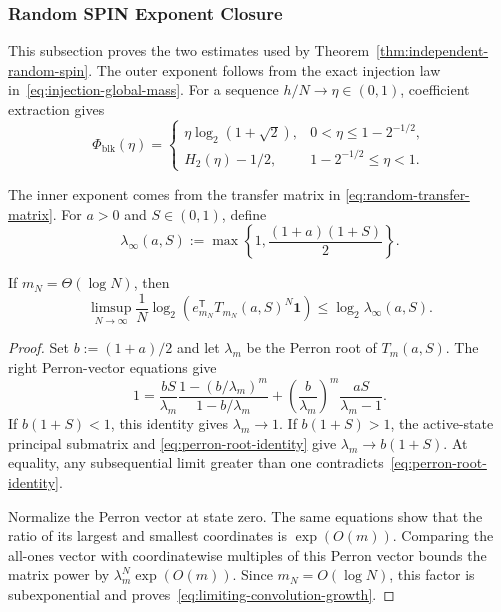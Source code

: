 \subsubsection{Random SPIN Exponent Closure}
\label{app:random-spin-exponents}

This subsection proves the two estimates used by
Theorem~\ref{thm:independent-random-spin}. The outer exponent follows from
the exact injection law in~\eqref{eq:injection-global-mass}. For a sequence
$h/N\to\eta\in(0,1)$, coefficient extraction gives
\begin{equation}
  \Phi_{\mathrm{blk}}(\eta)
  =
  \begin{cases}
    \eta\log_2(1+\sqrt2),
      &0<\eta\le1-2^{-1/2},\\[1mm]
    H_2(\eta)-1/2,
      &1-2^{-1/2}\le\eta<1.
  \end{cases}
  \label{eq:random-outer-linear-exponent}
\end{equation}

The inner exponent comes from the transfer matrix in
\eqref{eq:random-transfer-matrix}. For $a>0$ and $S\in(0,1)$, define
\[
  \lambda_\infty(a,S)
  :=
  \max\left\{1,\frac{(1+a)(1+S)}2\right\}.
\]

\begin{lemma}
\label{lem:limiting-convolution-growth}
If $m_N=\Theta(\log N)$, then
\begin{equation}
  \limsup_{N\to\infty}\frac1N\log_2
  \left(
    e_{m_N}^{\mathsf T}T_{m_N}(a,S)^N\boldsymbol 1
  \right)
  \le\log_2\lambda_\infty(a,S).
  \label{eq:limiting-convolution-growth}
\end{equation}
\end{lemma}

\begin{proof}
Set $b:=(1+a)/2$ and let $\lambda_m$ be the Perron root of
$T_m(a,S)$. The right Perron-vector equations give
\begin{equation}
  1
  =
  \frac{bS}{\lambda_m}
  \frac{1-(b/\lambda_m)^m}{1-b/\lambda_m}
  +
  \left(\frac b{\lambda_m}\right)^m
  \frac{aS}{\lambda_m-1}.
  \label{eq:perron-root-identity}
\end{equation}
If $b(1+S)<1$, this identity gives $\lambda_m\to1$. If
$b(1+S)>1$, the active-state principal submatrix and
\eqref{eq:perron-root-identity} give
$\lambda_m\to b(1+S)$. At equality, any subsequential limit greater than one
contradicts~\eqref{eq:perron-root-identity}.

Normalize the Perron vector at state zero. The same equations show that the
ratio of its largest and smallest coordinates is $\exp(O(m))$. Comparing the
all-ones vector with coordinatewise multiples of this Perron vector bounds the
matrix power by $\lambda_m^N\exp(O(m))$. Since $m_N=O(\log N)$, this factor is
subexponential and proves~\eqref{eq:limiting-convolution-growth}.
\end{proof}

